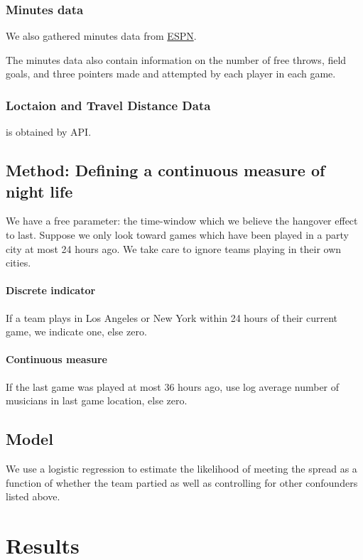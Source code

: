 \documentclass[letterpaper,12pt]{article}
\begin{document}
\subsubsection{Minutes data}
We also gathered minutes data from \href{http://www.espn.com/nba/scoreboard/_/date/}{ESPN}.

The minutes data also contain information on the number of free throws, field goals, and
three pointers made and attempted by each player in each game.

\subsubsection{Loctaion and Travel Distance Data} is obtained
by API.

\subsection{Method: Defining a continuous measure of night life}

We have a free parameter: the time-window which we believe the hangover effect
to last. Suppose we only look toward games which have been played in a party
city at most 24 hours ago. We take care to ignore
teams playing in their own cities.

\paragraph{Discrete indicator}
If a team plays in Los Angeles or New York within 24 hours of their current game,
we indicate one, else zero.

\paragraph{Continuous measure}
If the last game was played at most 36 hours ago, use log average number
of musicians in last game location, else zero.

\subsection{Model} We use a logistic regression to estimate the likelihood of meeting
the spread as a function of whether the team partied as well as controlling for other confounders
listed above.

\section{Results}
\end{document}
